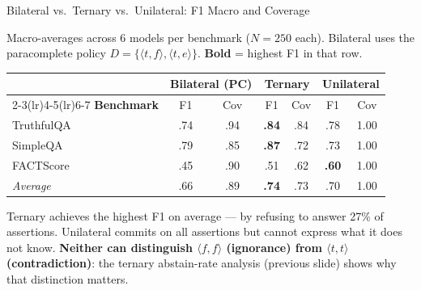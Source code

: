 \documentclass[aspectratio=169,9pt]{beamer}
\newcommand{\tv}[2]{\langle #1,#2 \rangle}
\begin{document}
\begin{frame}{Bilateral vs.\ Ternary vs.\ Unilateral: F1 Macro and Coverage}

  \small
  Macro-averages across 6 models per benchmark ($N=250$ each).
  Bilateral uses the paracomplete policy $D=\{\tv{t}{f},\tv{t}{e}\}$.
  \textbf{Bold} = highest F1 in that row.

  \smallskip

  \setlength{\tabcolsep}{5pt}
  \renewcommand{\arraystretch}{1.3}
  \small
  \begin{tabular}{l @{\quad} cc @{\quad} cc @{\quad} cc}
    \toprule
    & \multicolumn{2}{c}{\textbf{Bilateral (PC)}}
    & \multicolumn{2}{c}{\textbf{Ternary}}
    & \multicolumn{2}{c}{\textbf{Unilateral}} \\
    \cmidrule(lr){2-3}\cmidrule(lr){4-5}\cmidrule(lr){6-7}
    \textbf{Benchmark} & F1 & Cov & F1 & Cov & F1 & Cov \\
    \midrule
    TruthfulQA  & .74 & .94 & \textbf{.84} & .84 & .78 & 1.00 \\
    SimpleQA    & .79 & .85 & \textbf{.87} & .72 & .73 & 1.00 \\
    FACTScore   & .45 & .90 & .51          & .62 & \textbf{.60} & 1.00 \\
    \midrule
    \textit{Average} & .66 & .89 & \textbf{.74} & .73 & .70 & 1.00 \\
    \bottomrule
  \end{tabular}

  \medskip\footnotesize
  Ternary achieves the highest F1 on average --- by refusing to answer 27\% of
  assertions.  Unilateral commits on all assertions but cannot express what it
  does not know.  \textbf{Neither can distinguish $\tv{f}{f}$ (ignorance) from
  $\tv{t}{t}$ (contradiction)}: the ternary abstain-rate analysis (previous
  slide) shows why that distinction matters.

\end{frame}
\end{document}
